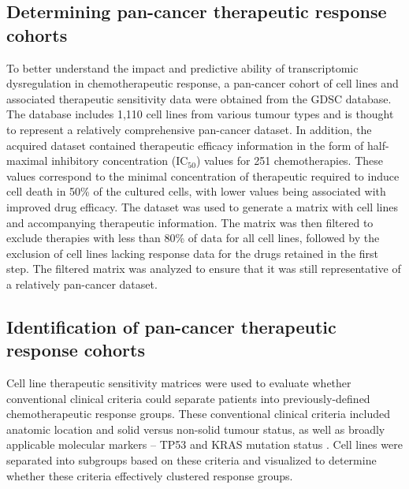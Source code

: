 \documentclass[10pt, letterpaper, twocolumn]{article}
\begin{document}
\subsection{Determining pan-cancer therapeutic response cohorts}
To better understand the impact and predictive ability of transcriptomic dysregulation in chemotherapeutic response, a pan-cancer cohort of cell lines and associated therapeutic sensitivity data were obtained from the GDSC database. The database includes 1,110 cell lines from various tumour types and is thought to represent a relatively comprehensive pan-cancer dataset. In addition, the acquired dataset contained therapeutic efficacy information in the form of half-maximal inhibitory concentration (IC$_{50}$) values for 251 chemotherapies. These values correspond to the minimal concentration of therapeutic required to induce cell death in 50\% of the cultured cells, with lower values being associated with improved drug efficacy. The dataset was used to generate a matrix with cell lines and accompanying therapeutic information. The matrix was then filtered to exclude therapies with less than 80\% of data for all cell lines, followed by the exclusion of cell lines lacking response data for the drugs retained in the first step. The filtered matrix was analyzed to ensure that it was still representative of a relatively pan-cancer dataset.


\subsection{Identification of pan-cancer therapeutic response cohorts}
Cell line therapeutic sensitivity matrices were used to evaluate whether conventional clinical criteria could separate patients into previously-defined chemotherapeutic response groups. These conventional clinical criteria included anatomic location and solid versus non-solid tumour status, as well as broadly applicable molecular markers -- TP53 and KRAS mutation status \cite{colorectal, gi, lung, breast}. Cell lines were separated into subgroups based on these criteria and visualized to determine whether these criteria effectively clustered response groups.
\end{document}
